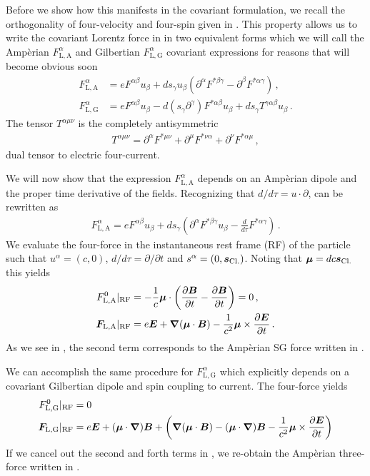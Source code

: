 Before we show how this manifests in the covariant formulation, we recall the orthogonality of four-velocity and four-spin given in . This property allows us to write the covariant Lorentz force in  in two equivalent forms which we will call the Amp{\`e}rian $F_\mathrm{L,A}^{\alpha}$ and Gilbertian $F_\mathrm{L,G}^{\alpha}$ covariant expressions for reasons that will become obvious soon
\begin{align}
\label{amp}
F_\mathrm{L,A}^{\alpha} &= eF^{\alpha\beta}u_{\beta} + ds_{\gamma}u_{\beta}(\partial^{\alpha}F^{*\beta\gamma}-\partial^{\beta}F^{*\alpha\gamma})\,,\\
\label{gil}
F_\mathrm{L,G}^{\alpha} &= eF^{\alpha\beta}u_{\beta} -d(s_{\gamma}\partial^{\gamma})F^{*\alpha\beta}u_{\beta}+ds_{\gamma}T^{\gamma\alpha\beta}u_{\beta}\,.
\end{align}
The tensor $T^{\alpha\mu\nu}$ is the completely antisymmetric
\begin{align}
    T^{\alpha\mu\nu} = \partial^{\alpha}F^{*\mu\nu}+\partial^{\mu}F^{*\nu\alpha}+\partial^{\nu}F^{*\alpha\mu}\,,
\end{align}
dual tensor to electric four-current.

We will now show that the expression $F_\mathrm{L,A}^{\alpha}$ depends on an Amp{\`e}rian dipole and the proper time derivative of the fields. Recognizing that $d/d\tau=u\cdot\partial$,  can be rewritten as
\begin{align}
F_\mathrm{L,A}^{\alpha} = eF^{\alpha\beta}u_{\beta} + ds_{\gamma}\left(\partial^{\alpha}F^{*\beta\gamma}u_{\beta}-\frac{d}{d\tau}F^{*\alpha\gamma}\right)\,.
\end{align}
We evaluate the four-force in the instantaneous rest frame (RF) of the particle such that $u^{\alpha}=(c,0)$, $d/d\tau=\partial/\partial t$ and $s^{\alpha}=(0,\boldsymbol{s}_\mathrm{Cl.})$. Noting that $\boldsymbol{\mu}=dc\boldsymbol{s}_\mathrm{Cl.}$ this yields
\begin{alignat}{1}
\label{amp:1}
F_\mathrm{L,A}^{0}\vert_\mathrm{RF} &= -\frac{1}{c}\boldsymbol{\mu}\cdot\left(\frac{\partial\boldsymbol{B}}{\partial t}-\frac{\partial\boldsymbol{B}}{\partial t}\right)=0\,,\\
\label{amp:2}
\boldsymbol{F}_\mathrm{L,A}\vert_\mathrm{RF} &= e\boldsymbol{E} + \boldsymbol{\nabla}(\boldsymbol{\mu}\cdot\boldsymbol{B})-\frac{1}{c^{2}}\boldsymbol{\mu}\times\frac{\partial\boldsymbol{E}}{\partial t}\,.
\end{alignat}
As we see in , the second term corresponds to the Amp{\`e}rian SG force written in .

We can accomplish the same procedure for $F_\mathrm{L,G}^{\alpha}$ which explicitly depends on a covariant Gilbertian dipole and spin coupling to current. The four-force yields
\begin{alignat}{1}
\label{gil:1}
F_\mathrm{L,G}^{0}\vert_\mathrm{RF} &=0\\
\label{gil:2}
\boldsymbol{F}_\mathrm{L,G}\vert_\mathrm{RF} &= e\boldsymbol{E} +(\boldsymbol{\mu}\cdot\boldsymbol{\nabla})\boldsymbol{B}+\left(\boldsymbol{\nabla}(\boldsymbol{\mu}\cdot\boldsymbol{B})-(\boldsymbol{\mu}\cdot\boldsymbol{\nabla})\boldsymbol{B}-\frac{1}{c^{2}}\boldsymbol{\mu}\times\frac{\partial\boldsymbol{E}}{\partial t}\right)
\end{alignat}
If we cancel out the second and forth terms in , we re-obtain the Amp{\`e}rian three-force written in .

